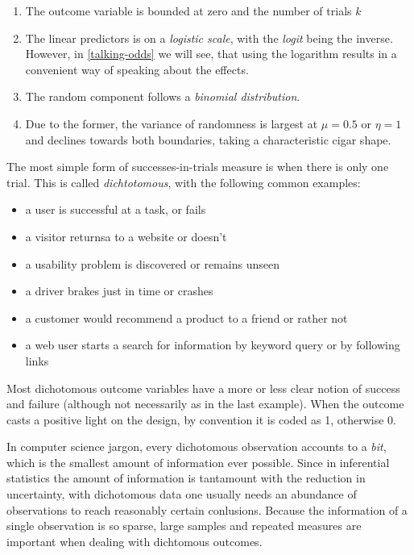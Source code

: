 \documentclass[]{svmono}
\providecommand{\tightlist}{%
  \setlength{\itemsep}{0pt}\setlength{\parskip}{0pt}}
\theoremstyle{definition}
\theoremstyle{definition}
\theoremstyle{definition}
\theoremstyle{remark}
\begin{document}
\begin{enumerate}
\def\labelenumi{\arabic{enumi}.}
\tightlist
\item
  The outcome variable is bounded at zero and the number of trials \(k\)
\item
  The linear predictors is on a \emph{logistic scale}, with the
  \emph{logit} being the inverse. However, in \ref{talking-odds} we will
  see, that using the logarithm results in a convenient way of speaking
  about the effects.
\item
  The random component follows a \emph{binomial distribution}.
\item
  Due to the former, the variance of randomness is largest at
  \(\mu = 0.5\) or \(\eta = 1\) and declines towards both boundaries,
  taking a characteristic cigar shape.
\end{enumerate}

The most simple form of successes-in-trials measure is when there is
only one trial. This is called \emph{dichtotomous}, with the following
common examples:

\begin{itemize}
\tightlist
\item
  a user is successful at a task, or fails
\item
  a visitor returnsa to a website or doesn't
\item
  a usability problem is discovered or remains unseen
\item
  a driver brakes just in time or crashes
\item
  a customer would recommend a product to a friend or rather not
\item
  a web user starts a search for information by keyword query or by
  following links
\end{itemize}

Most dichotomous outcome variables have a more or less clear notion of
success and failure (although not necessarily as in the last example).
When the outcome casts a positive light on the design, by convention it
is coded as 1, otherwise 0.

In computer science jargon, every dichotomous observation accounts to a
\emph{bit}, which is the smallest amount of information ever possible.
Since in inferential statistics the amount of information is tantamount
with the reduction in uncertainty, with dichotomous data one usually
needs an abundance of observations to reach reasonably certain
conlusions. Because the information of a single observation is so
sparse, large samples and repeated measures are important when dealing
with dichtomous outcomes.
\end{document}
